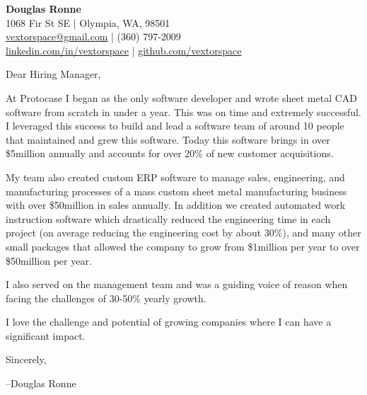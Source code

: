 \documentclass[letter,12pt]{article}
\begin{document}
\begin{center}
    {\Huge \textbf{Douglas Ronne}}\\
    \vspace{2mm}
    1068 Fir St SE | Olympia, WA, 98501\\
    \href{mailto:vextorspace@gmail.com}{vextorspace@gmail.com} | (360) 797-2009\\
    \href{www.linkedin.com/in/douglas-ronne-7133272a}{linkedin.com/in/vextorspace} | \href{https://github.com/vextorspace}{github.com/vextorspace}
\end{center}

Dear Hiring Manager,

\vspace{.5cm}
\noindent
At Protocase I began as the only software developer and wrote sheet metal CAD software from scratch in under a year. This was on time and extremely successful. I leveraged this success to build and lead a software team of around 10 people that maintained and grew this software. Today this software brings in over \$5million annually and accounts for over 20\% of new customer acquisitions.

\vspace{.5cm}
\noindent
My team also created custom ERP software to manage sales, engineering, and manufacturing processes of a  mass custom sheet metal manufacturing business with over \$50million in sales annually. In addition we created automated work instruction software which drastically reduced the engineering time in each project (on average reducing the engineering cost by about 30\%), and many other small packages that allowed the company to grow from \$1million per year to over \$50million per year.

\vspace{.5cm}
\noindent
I also served on the management team and was a guiding voice of reason when facing the challenges of 30-50\% yearly growth.

\vspace{.5cm}
\noindent
I love the challenge and potential of growing companies where I can have a significant impact.

\vspace{1cm}
\noindent
Sincerely,

\noindent
--Douglas Ronne
\end{document}
